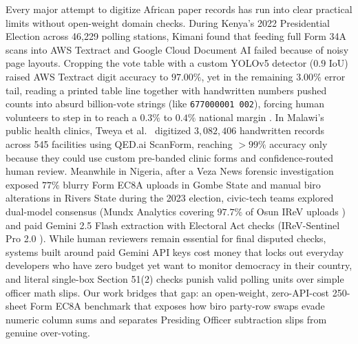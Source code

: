 \documentclass{article}
\begin{document}
Every major attempt to digitize African paper records has run into clear practical limits without open-weight domain checks. During Kenya's 2022 Presidential Election across 46,229 polling stations, Kimani \cite{kimani2022using} found that feeding full Form 34A scans into AWS Textract and Google Cloud Document AI failed because of noisy page layouts. Cropping the vote table with a custom YOLOv5 detector ($0.9$ IoU) raised AWS Textract digit accuracy to $97.00\%$, yet in the remaining $3.00\%$ error tail, reading a printed table line together with handwritten numbers pushed counts into absurd billion-vote strings (like \texttt{677000001 002}), forcing human volunteers to step in to reach a $0.3\%$ to $0.4\%$ national margin \cite{kimani2022using}. In Malawi's public health clinics, Tweya et al.\ \cite{tweya2026digitising} digitized $3,082,406$ handwritten records across 545 facilities using QED.ai ScanForm, reaching $>99\%$ accuracy only because they could use custom pre-banded clinic forms and confidence-routed human review. Meanwhile in Nigeria, after a Veza News forensic investigation \cite{veza2024inec} exposed $77\%$ blurry Form EC8A uploads in Gombe State and manual biro alterations in Rivers State during the 2023 election, civic-tech teams explored dual-model consensus (Mundx Analytics covering $97.7\%$ of Osun IReV uploads \cite{uwakwe2026ai}) and paid Gemini 2.5 Flash extraction with Electoral Act checks (IReV-Sentinel Pro 2.0 \cite{young2026irevsentinel}). While human reviewers remain essential for final disputed checks, systems built around paid Gemini API keys cost money that locks out everyday developers who have zero budget yet want to monitor democracy in their country, and literal single-box Section 51(2) checks \cite{inec2022electoral,young2026irevsentinel} punish valid polling units over simple officer math slips. Our work bridges that gap: an open-weight, zero-API-cost 250-sheet Form EC8A benchmark that exposes how biro party-row swaps evade numeric column sums and separates Presiding Officer subtraction slips from genuine over-voting.
\end{document}
